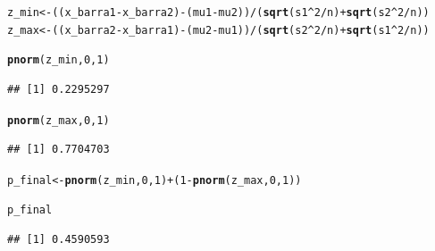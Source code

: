 \documentclass{beamer}\usepackage[]{graphicx}\usepackage[]{color}
\makeatletter
\newcommand{\hlnum}[1]{\textcolor[rgb]{0.686,0.059,0.569}{#1}}%
\newcommand{\hlopt}[1]{\textcolor[rgb]{0,0,0}{#1}}%
\newcommand{\hlstd}[1]{\textcolor[rgb]{0.345,0.345,0.345}{#1}}%
\newcommand{\hlkwb}[1]{\textcolor[rgb]{0.69,0.353,0.396}{#1}}%
\newcommand{\hlkwd}[1]{\textcolor[rgb]{0.737,0.353,0.396}{\textbf{#1}}}%
\newenvironment{kframe}{%
 \def\at@end@of@kframe{}%
 \ifinner\ifhmode%
  \def\at@end@of@kframe{\end{minipage}}%
  \begin{minipage}{\columnwidth}%
 \fi\fi%
 \def\FrameCommand##1{\hskip\@totalleftmargin \hskip-\fboxsep
 \colorbox{shadecolor}{##1}\hskip-\fboxsep
     \hskip-\linewidth \hskip-\@totalleftmargin \hskip\columnwidth}%
 \MakeFramed {\advance\hsize-\width
   \@totalleftmargin\z@ \linewidth\hsize
   \@setminipage}}%
 {\par\unskip\endMakeFramed%
 \at@end@of@kframe}
\newenvironment{knitrout}{}{} %
\renewenvironment{knitrout}{\setlength{\topsep}{0mm}}{}
\makeatother
\begin{document}
\begin{frame}[fragile]

\begin{knitrout}\tiny
{}\color{fgcolor}\begin{kframe}
\begin{alltt}
\hlstd{z_min} \hlkwb{<-} \hlstd{((x_barra1}\hlopt{-}\hlstd{x_barra2)}\hlopt{-}\hlstd{(mu1}\hlopt{-}\hlstd{mu2))}\hlopt{/}\hlstd{(}\hlkwd{sqrt}\hlstd{(s1}\hlopt{^}\hlnum{2}\hlopt{/}\hlstd{n)}\hlopt{+}\hlkwd{sqrt}\hlstd{(s2}\hlopt{^}\hlnum{2}\hlopt{/}\hlstd{n))}
\hlstd{z_max} \hlkwb{<-} \hlstd{((x_barra2}\hlopt{-}\hlstd{x_barra1)}\hlopt{-}\hlstd{(mu2}\hlopt{-}\hlstd{mu1))}\hlopt{/}\hlstd{(}\hlkwd{sqrt}\hlstd{(s2}\hlopt{^}\hlnum{2}\hlopt{/}\hlstd{n)}\hlopt{+}\hlkwd{sqrt}\hlstd{(s1}\hlopt{^}\hlnum{2}\hlopt{/}\hlstd{n))}

\hlkwd{pnorm}\hlstd{(z_min,}\hlnum{0}\hlstd{,}\hlnum{1}\hlstd{)}
\end{alltt}
\begin{verbatim}
## [1] 0.2295297
\end{verbatim}
\begin{alltt}
\hlkwd{pnorm}\hlstd{(z_max,}\hlnum{0}\hlstd{,}\hlnum{1}\hlstd{)}
\end{alltt}
\begin{verbatim}
## [1] 0.7704703
\end{verbatim}
\begin{alltt}
\hlstd{p_final} \hlkwb{<-} \hlkwd{pnorm}\hlstd{(z_min,}\hlnum{0}\hlstd{,}\hlnum{1}\hlstd{)} \hlopt{+} \hlstd{(}\hlnum{1} \hlopt{-} \hlkwd{pnorm}\hlstd{(z_max,}\hlnum{0}\hlstd{,}\hlnum{1}\hlstd{))}

\hlstd{p_final}
\end{alltt}
\begin{verbatim}
## [1] 0.4590593
\end{verbatim}
\end{kframe}
\end{knitrout}


\end{frame} 
\end{document}
